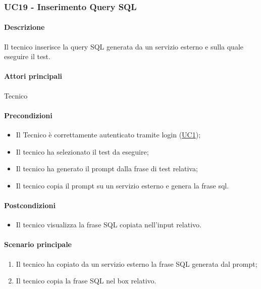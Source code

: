 \subsubsection{UC19 - Inserimento Query SQL}\label{UC19}
\paragraph*{Descrizione}
Il tecnico inserisce la query SQL generata da un servizio esterno e sulla quale eseguire il test.

\paragraph*{Attori principali}
Tecnico

\paragraph*{Precondizioni}
\begin{itemize}
  \item Il Tecnico è correttamente autenticato tramite login (\hyperref[UC1]{UC1});
  \item Il tecnico ha selezionato il test da eseguire;
  \item Il tecnico ha generato il prompt dalla frase di test relativa;
  \item Il tecnico copia il prompt su un servizio esterno e genera la frase sql.
\end{itemize}

\paragraph*{Postcondizioni}
\begin{itemize}
  \item Il tecnico visualizza la frase SQL copiata nell’input relativo.
\end{itemize}

\paragraph*{Scenario principale}
\begin{enumerate}
  \item Il tecnico ha copiato da un servizio esterno la frase SQL generata dal prompt;
  \item Il tecnico copia la frase SQL nel box relativo.
\end{enumerate}
